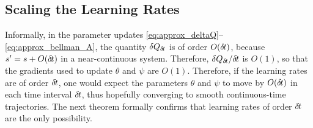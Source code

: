 \subsection{Scaling the Learning Rates}
\label{subsec:lr}


Informally, in the parameter updates
\eqref{eq:approx_deltaQ}--\eqref{eq:approx_bellman_A}, the quantity $\delta
Q_{\delta\hspace{-.1em}t}$ is of order $O({\delta\hspace{-.1em}t})$, because $s'=s+O({\delta\hspace{-.1em}t})$ in a
near-continuous system. Therefore, $\delta
Q_{\delta\hspace{-.1em}t}/{\delta\hspace{-.1em}t}$ is $O(1)$, so that the gradients used to
update $\theta$ and $\psi$ are $O(1)$. Therefore, if the
learning rates are of order ${\delta\hspace{-.1em}t}$, one would expect 
the parameters $\theta$ and $\psi$ to move by $O({\delta\hspace{-.1em}t})$ in
each time interval ${\delta\hspace{-.1em}t}$, thus hopefully converging to smooth
continuous-time trajectories. The next theorem formally confirms that
learning rates of order ${\delta\hspace{-.1em}t}$ are the only possibility.


